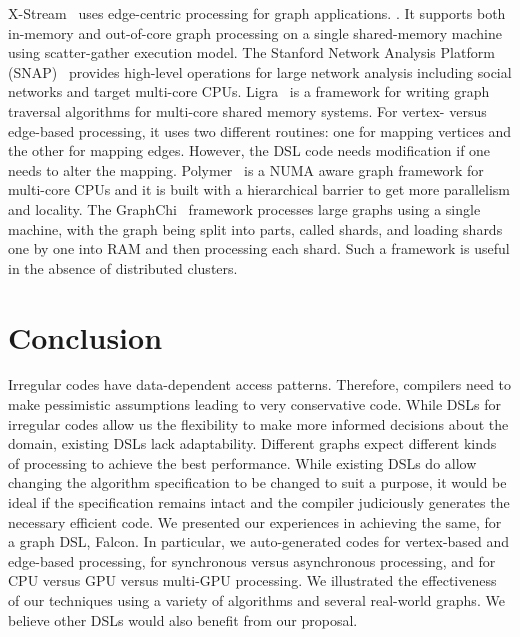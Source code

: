 \documentclass[12pt]{article}
\newcommand{\REM}[1]{}
\begin{document}
X-Stream~\cite{Roy:2013:XEG:2517349.2522740}  uses edge-centric processing for graph applications.
\REM{ rather than using vertex centric processing for algorithms such as SSSP and Strongly Connected Component (SCC)}. 
It supports both in-memory and out-of-core graph processing on a single shared-memory machine using scatter-gather execution model.
The Stanford Network Analysis Platform (SNAP)~\cite{Leskovec:2016:SGN:2973184.2898361} provides high-level operations for large network analysis including social networks and target
multi-core CPUs. 
Ligra~\cite{Shun:2013:LLG:2517327.2442530} is a framework for writing graph traversal algorithms
for multi-core shared memory systems. For vertex- versus edge-based processing, it uses two different routines: one for  mapping  vertices and the other for mapping  edges. However, the DSL code needs modification if one needs to alter the mapping.
Polymer~\cite{Zhang:2015:NGA:2858788.2688507} is a NUMA aware graph framework for multi-core CPUs and it is built
with a hierarchical barrier to get more parallelism and locality. 
The GraphChi~\cite{Kyrola:2012:GLG:2387880.2387884} framework processes large graphs using a
single machine, with the graph being split into  parts, called shards, and loading shards one by one into RAM and then processing each shard. 
Such a framework is useful in the absence of distributed clusters.


\section{Conclusion}\label{sec:conclusion}
Irregular codes have data-dependent access patterns.
Therefore, compilers need to make pessimistic assumptions leading to very conservative code.
While DSLs for irregular codes allow us the flexibility to make more informed decisions about the domain, existing DSLs lack adaptability.
Different graphs expect different kinds of processing to achieve the best performance.
While existing DSLs do allow changing the algorithm specification to be changed to suit a purpose, it would be ideal if the specification remains intact and the compiler judiciously generates the necessary efficient code.
We presented our experiences in achieving the same, for a graph DSL, Falcon.
In particular, we auto-generated codes for vertex-based and edge-based processing, for synchronous versus asynchronous processing, and for CPU versus GPU versus multi-GPU processing.
We illustrated the effectiveness of our techniques using a variety of algorithms and several real-world graphs.
We believe other DSLs would also benefit from our proposal.




\end{document}
